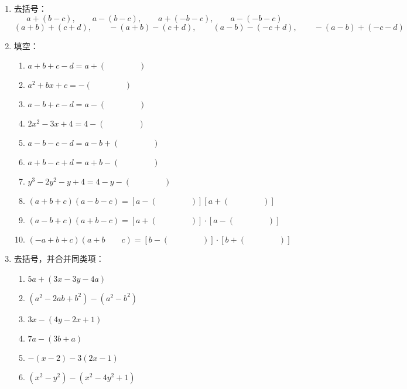 \begin{enumerate}
\item  去括号：
\[a+(b-c),\qquad a-(b-c),\qquad a+(-b-c),\qquad a-(-b-c) \]
\[(a+b)+(c+d),\qquad -(a+b)-(c+d),\qquad (a-b)-(-c+d),\qquad -(a-b)+(-c-d) \]

\item 填空：
\begin{enumerate}
    \item $a+b+c-d=a+(\qquad\qquad)$
    \item $a^2+bx+c=-(\qquad\qquad)$
    \item $a-b+c-d=a-(\qquad\qquad)$
    \item $2x^2-3x+4=4-(\qquad\qquad)$

    \item  $a-b-c-d=a-b+(\qquad\qquad)$
    \item $a+b-c+d=a+b-(\qquad\qquad)$
    \item $y^{3}-2 y^{2}-y+4=4-y-(\qquad\qquad)$
    \item $(a+b+c)(a-b-c)=[a-(\qquad\qquad)][a+(\qquad\qquad)]$
    \item $(a-b+c)(a+b-c)=[a+(\qquad\qquad )]\cdot [a-(\qquad\qquad)]$
    \item $(-a+b+c)(a+b \qquad c)=[b-(\qquad\qquad)] \cdot[b+(\qquad\qquad)]$
 
\end{enumerate}

\item 去括号，并合并同类项：
   \begin{multicols}{2}
\begin{enumerate}
    \item  $5 a+(3 x-3 y-4 a)$
    \item   $\left(a^{2}-2 a b+b^{2}\right)-\left(a^{2}-b^{2}\right)$
    \item  $3 x-(4 y-2 x+1) $
    \item   $7 a-(3 b+a)$
    \item  $-(x-2)-3(2 x-1)$
    \item  $\left(x^{2}-y^{2}\right)-\left(x^{2}-4 y^{2}+1\right)$
     
\end{enumerate}
    \end{multicols}


\end{enumerate}
